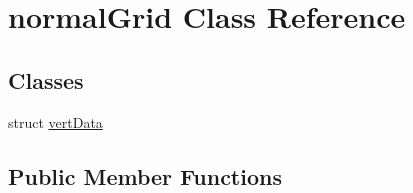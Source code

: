 \hypertarget{classnormalGrid}{\section{normal\-Grid Class Reference}
\label{classnormalGrid}
}
\subsection*{Classes}
\begin{DoxyCompactItemize}
\item 
struct \hyperlink{structnormalGrid_1_1vertData}{vert\-Data}
\end{DoxyCompactItemize}
\subsection*{Public Member Functions}
